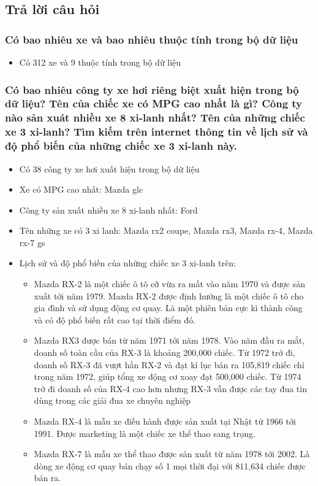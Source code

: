 \documentclass[a4paper, 12pt]{article}
\begin{document}
\subsection{Trả lời câu hỏi}
    \subsubsection{Có bao nhiêu xe và bao nhiêu thuộc tính trong bộ dữ liệu}
        \begin{itemize}
            \item Có 312 xe và 9 thuộc tính trong bộ dữ liệu
        \end{itemize}

    \subsubsection{Có bao nhiêu công ty xe hơi riêng biệt xuất hiện trong bộ dữ liệu? Tên của chiếc xe có MPG cao nhất là gì? Công ty nào sản xuát nhiều xe 8 xi-lanh nhất? Tên của những chiếc xe 3 xi-lanh? Tìm kiếm trên internet thông tin về lịch sử và độ phổ biến của những chiếc xe 3 xi-lanh này.}
        \begin{itemize}
            \item Có 38 công ty xe hơi xuất hiện trong bộ dữ liệu
            \item Xe có MPG cao nhất: Mazda glc
            \item Công ty sản xuất nhiều xe 8 xi-lanh nhất: Ford
            \item Tên những xe có 3 xi lanh: Mazda rx2 coupe, Maxda rx3, Mazda rx-4, Mazda rx-7 gs
            \item Lịch sử và độ phổ biến của những chiếc xe 3 xi-lanh trên:
                \begin{itemize}
                    \item Mazda RX-2 là một chiếc ô tô cỡ vừa ra mắt vào năm 1970 và được sản xuất tới năm 1979. Mazda RX-2 được định hướng là một chiếc ô tô cho gia đình và sử dụng động cơ quay. Là một phiên bản cực kì thành công và có độ phổ biến rất cao tại thời điểm đó.
                    \item Mazda RX3 được bán từ năm 1971 tới năm 1978. Vào năm đầu ra mắt, doanh số toàn cầu của RX-3 là khoảng 200,000 chiếc. Từ 1972 trở đi, doanh số RX-3 đã vượt hẳn RX-2 và đạt kỉ lục bán ra 105,819 chiếc chỉ trong năm 1972, giúp tổng xe động cơ xoay đạt 500,000 chiếc. Từ 1974 trở đi doanh số của RX-4 cao hơn nhưng RX-3 vẫn được các tay đua tin dùng trong các giải đua xe chuyên nghiệp
                    \item Mazda RX-4 là mẫu xe điều hành được sản xuất tại Nhật từ 1966 tới 1991. Được marketing là một chiếc xe thể thao sang trọng.
                    \item Mazda RX-7 là mẫu xe thể thao được sản xuất từ năm 1978 tới 2002. Là dòng xe động cơ quay bán chạy số 1 mọi thời đại với 811,634 chiếc được bán ra. 
                \end{itemize}
        \end{itemize}
        
\end{document}
